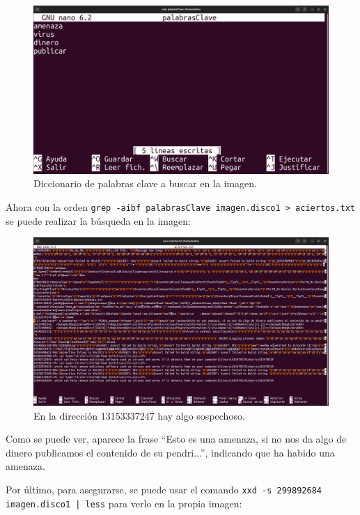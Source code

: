 \documentclass{article}
\begin{document}
\begin{figure}[H]
    \centering
    \includegraphics[width=\textwidth]{imagenes/Captura desde 2022-12-02 18-52-07.png}
    \caption{Diccionario de palabras clave a buscar en la imagen.}
\end{figure}

\newpage

Ahora con la orden \verb|grep -aibf palabrasClave imagen.disco1 > aciertos.txt| se puede realizar la búsqueda en la imagen:

\begin{figure}[H]
    \centering
    \includegraphics[width=\textwidth]{imagenes/Captura desde 2022-12-03 21-38-57.png}
    \caption{En la dirección 13153337247 hay algo sospechoso.}
\end{figure}
Como se puede ver, aparece la frase ``Esto es una amenaza, si no nos da algo de dinero publicamos el contenido de su pendri...'', indicando que ha habido una amenaza.

\newpage

Por último, para asegurarse, se puede usar el comando \texttt{xxd -s 299892684 imagen.disco1 | less} para verlo en la propia imagen:
\end{document}
